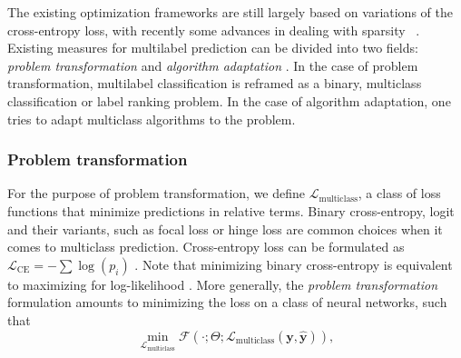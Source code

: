 The existing optimization frameworks are still largely based on variations of
the cross-entropy loss, with recently some advances in dealing with
sparsity~\citep[see, e.g.,][]{focalLoss,tencent} . Existing measures for multilabel prediction can be
divided into two fields: \emph{problem transformation} and \emph{algorithm
adaptation} \cite{multilabelReview}. In the case of problem transformation,
multilabel classification is reframed as a binary, multiclass classification
or label ranking problem. In the case of algorithm adaptation, one tries to
adapt multiclass algorithms to the problem.

\subsubsection{Problem transformation} For the purpose of problem transformation,
we define \(\mathcal{L}_{\text {multiclass}}\), a class of loss functions that
minimize predictions in relative terms. Binary cross-entropy, logit and their
variants, such as focal loss or hinge loss are common choices when it comes to
multiclass prediction. Cross-entropy loss can be formulated as
\(\mathcal{L}_{\text {CE}}=-\sum \log \left(p_{i}\right)\) . Note that
minimizing binary cross-entropy is equivalent to maximizing for log-likelihood
\cite[Section 4.3.4]{Bishop}. More generally, the \emph{problem
transformation} formulation amounts to minimizing the loss on a class of
neural networks, such that
%
\begin{equation}
\underset{\mathcal{L}_{\text {multiclass}}} {\min} \mathcal{F}\left(\cdot ;
\Theta; \mathcal{L}_{\text {multiclass}} (\mathbf{y}, \hat{\mathbf{y}})
\right),
\end{equation}
%


